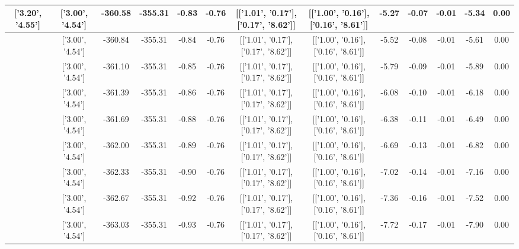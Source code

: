 \begin{table}[htbp]
\begin{adjustbox}{angle=90}
\begin{tabular}{|c|c|c|c|c|c|c|c|c|c|c|c|c|}
 ['3.20', '4.55'] & ['3.00', '4.54'] & -360.58 & -355.31 & -0.83 & -0.76 & [['1.01', '0.17'], ['0.17', '8.62']] & [['1.00', '0.16'], ['0.16', '8.61']] & -5.27 & -0.07 & -0.01 & -5.34 & 0.00\\ \hline
 ['3.21', '4.55'] & ['3.00', '4.54'] & -360.84 & -355.31 & -0.84 & -0.76 & [['1.01', '0.17'], ['0.17', '8.62']] & [['1.00', '0.16'], ['0.16', '8.61']] & -5.52 & -0.08 & -0.01 & -5.61 & 0.00\\ \hline
 ['3.22', '4.55'] & ['3.00', '4.54'] & -361.10 & -355.31 & -0.85 & -0.76 & [['1.01', '0.17'], ['0.17', '8.62']] & [['1.00', '0.16'], ['0.16', '8.61']] & -5.79 & -0.09 & -0.01 & -5.89 & 0.00\\ \hline
 ['3.23', '4.55'] & ['3.00', '4.54'] & -361.39 & -355.31 & -0.86 & -0.76 & [['1.01', '0.17'], ['0.17', '8.62']] & [['1.00', '0.16'], ['0.16', '8.61']] & -6.08 & -0.10 & -0.01 & -6.18 & 0.00\\ \hline
 ['3.25', '4.55'] & ['3.00', '4.54'] & -361.69 & -355.31 & -0.88 & -0.76 & [['1.01', '0.17'], ['0.17', '8.62']] & [['1.00', '0.16'], ['0.16', '8.61']] & -6.38 & -0.11 & -0.01 & -6.49 & 0.00\\ \hline
 ['3.26', '4.56'] & ['3.00', '4.54'] & -362.00 & -355.31 & -0.89 & -0.76 & [['1.01', '0.17'], ['0.17', '8.62']] & [['1.00', '0.16'], ['0.16', '8.61']] & -6.69 & -0.13 & -0.01 & -6.82 & 0.00\\ \hline
 ['3.27', '4.56'] & ['3.00', '4.54'] & -362.33 & -355.31 & -0.90 & -0.76 & [['1.01', '0.17'], ['0.17', '8.62']] & [['1.00', '0.16'], ['0.16', '8.61']] & -7.02 & -0.14 & -0.01 & -7.16 & 0.00\\ \hline
 ['3.28', '4.56'] & ['3.00', '4.54'] & -362.67 & -355.31 & -0.92 & -0.76 & [['1.01', '0.17'], ['0.17', '8.62']] & [['1.00', '0.16'], ['0.16', '8.61']] & -7.36 & -0.16 & -0.01 & -7.52 & 0.00\\ \hline
 ['3.29', '4.56'] & ['3.00', '4.54'] & -363.03 & -355.31 & -0.93 & -0.76 & [['1.01', '0.17'], ['0.17', '8.62']] & [['1.00', '0.16'], ['0.16', '8.61']] & -7.72 & -0.17 & -0.01 & -7.90 & 0.00\\ \hline
            \end{tabular}
        \end{adjustbox}
        \caption{}
        \label{}
    \end{table}
    